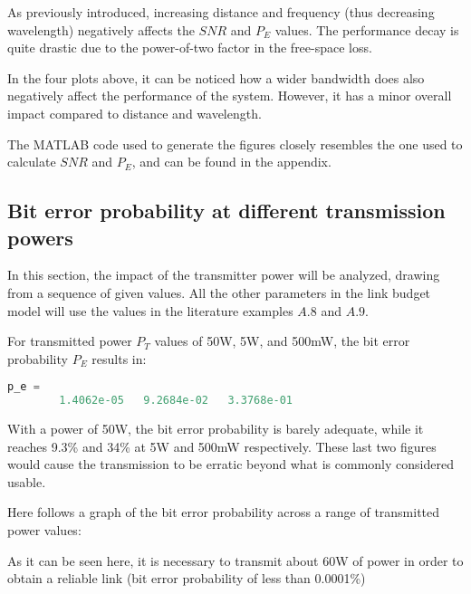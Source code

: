 
As previously introduced, increasing distance and frequency (thus decreasing wavelength) negatively affects the $SNR$ and $P_E$ values.
The performance decay is quite drastic due to the power-of-two factor in the free-space loss.



In the four plots above, it can be noticed how a wider bandwidth does also negatively affect the performance of the system.
However, it has a minor overall impact compared to distance and wavelength.

The MATLAB code used to generate the figures closely resembles the one used to calculate $SNR$ and $P_E$, and can be found in the appendix.


\subsection{Bit error probability at different transmission powers}
In this section, the impact of the transmitter power will be analyzed, drawing from a sequence of given values.
All the other parameters in the link budget model will use the values in the literature examples $A.8$ and $A.9$.

For transmitted power $P_T$ values of 50W, 5W, and 500mW, the bit error probability $P_E$ results in:

\begin{lstlisting}[language=Octave]
    p_e =
        1.4062e-05   9.2684e-02   3.3768e-01
\end{lstlisting}

With a power of 50W, the bit error probability is barely adequate, while it reaches 9.3\% and 34\% at 5W and 500mW respectively.
These last two figures would cause the transmission to be erratic beyond what is commonly considered usable.

Here follows a graph of the bit error probability across a range of transmitted power values:


As it can be seen here, it is necessary to transmit about 60W of power in order to obtain a reliable link (bit error probability of less than 0.0001\%)


